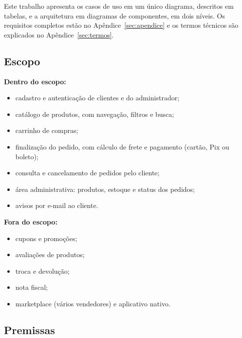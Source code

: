 \documentclass[12pt,a4paper]{article}
\providecommand{\tightlist}{%
  \setlength{\itemsep}{0pt}\setlength{\parskip}{0pt}}
\begin{document}
Este trabalho apresenta os casos de uso em um único diagrama, descritos em
tabelas, e a arquitetura em diagramas de componentes, em dois níveis. Os
requisitos completos estão no Apêndice~\ref{sec:apendice} e os termos técnicos
são explicados no Apêndice~\ref{sec:termos}.

\subsection{Escopo}

\noindent\textbf{Dentro do escopo:}
\begin{itemize}
\tightlist
\item cadastro e autenticação de clientes e do administrador;
\item catálogo de produtos, com navegação, filtros e busca;
\item carrinho de compras;
\item finalização do pedido, com cálculo de frete e pagamento (cartão, Pix ou boleto);
\item consulta e cancelamento de pedidos pelo cliente;
\item área administrativa: produtos, estoque e status dos pedidos;
\item avisos por e-mail ao cliente.
\end{itemize}

\noindent\textbf{Fora do escopo:}
\begin{itemize}
\tightlist
\item cupons e promoções;
\item avaliações de produtos;
\item troca e devolução;
\item nota fiscal;
\item marketplace (vários vendedores) e aplicativo nativo.
\end{itemize}

\subsection{Premissas}\label{sec:premissas}
\end{document}
